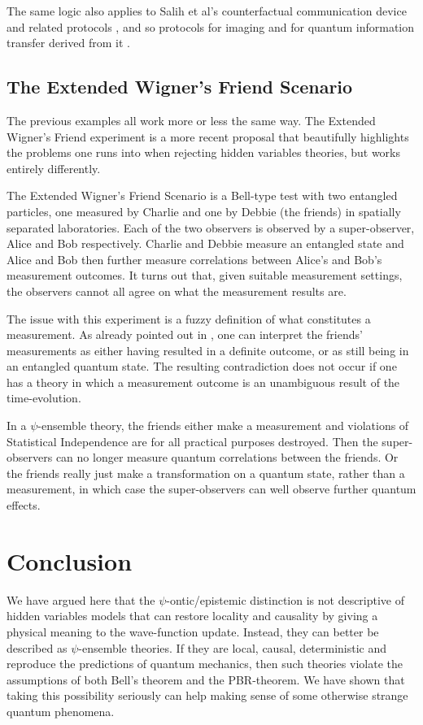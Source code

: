 \documentclass[superscriptaddress,twocolumn,floatfix,nofootinbib]{revtex4-2}
\begin{document}
The same logic also applies to Salih et al's counterfactual communication device and related protocols \cite{Salih2013Protocol,Salih2018Laws,Hance2021Quantum}, and so protocols for imaging \cite{Hance2021CFGI} and for quantum information transfer derived from it \cite{Salih2020DetTele,Salih2021EFQubit}.

\subsection{The Extended Wigner's Friend Scenario}

The previous examples all work more or less the same way. The Extended Wigner's Friend experiment \cite{Frauchiger2018Wigner} is a more recent proposal that beautifully highlights the problems one runs into when rejecting hidden variables theories, but works entirely differently. 

The Extended Wigner's Friend Scenario is a Bell-type test with two entangled particles, one measured by Charlie and one by Debbie (the friends) in spatially separated laboratories. Each of the two observers is observed by a super-observer, Alice and Bob respectively. Charlie and Debbie measure an entangled state and Alice and Bob then further measure correlations between Alice's and Bob's measurement outcomes. It turns out that, given suitable measurement settings, the observers cannot all agree on what the measurement results are. 

The issue with this experiment is a fuzzy definition of what constitutes a measurement. As already pointed out in \cite{relano2018decoherence,zukowski2021physics}, one can interpret the friends' measurements as either having resulted in a definite outcome, or as still being in an entangled quantum state. The resulting contradiction does not occur if one has a theory in which a measurement outcome is an unambiguous result of the time-evolution. 

In a $\psi$-ensemble theory, the friends either make a measurement and violations of Statistical Independence are for all practical purposes destroyed. Then the super-observers can no longer measure quantum correlations between the friends. Or the friends really just make a transformation on a quantum state, rather than a measurement, in which case the super-observers can well observe further quantum effects. 

\section{Conclusion}
We have argued here that the $\psi$-ontic/epistemic distinction is not descriptive of hidden variables models that can restore locality and causality by giving a physical meaning to the wave-function update. Instead, they can better be described as $\psi$-ensemble theories. If they are local, causal, deterministic and reproduce the predictions of quantum mechanics, then such theories violate the assumptions of both Bell's theorem and the {\sc PBR}-theorem. We have shown that taking this possibility seriously can help making sense of some otherwise strange quantum phenomena. 
\end{document}
